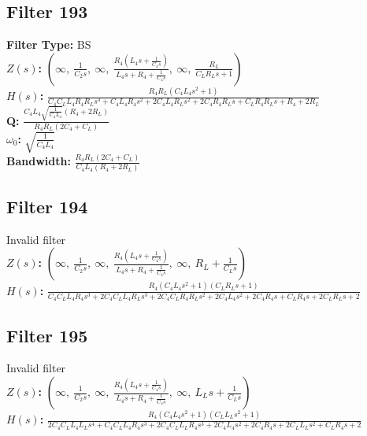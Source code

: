 \documentclass{article}
\begin{document}
\subsection*{Filter 193}
\textbf{Filter Type:} BS \\ 
\textbf{$Z(s)$:} $\left( \infty, \  \frac{1}{C_{2} s}, \  \infty, \  \frac{R_{4} \left(L_{4} s + \frac{1}{C_{4} s}\right)}{L_{4} s + R_{4} + \frac{1}{C_{4} s}}, \  \infty, \  \frac{R_{L}}{C_{L} R_{L} s + 1}\right)$ \\ 
\textbf{$H(s)$:} $\frac{R_{4} R_{L} \left(C_{4} L_{4} s^{2} + 1\right)}{C_{4} C_{L} L_{4} R_{4} R_{L} s^{3} + C_{4} L_{4} R_{4} s^{2} + 2 C_{4} L_{4} R_{L} s^{2} + 2 C_{4} R_{4} R_{L} s + C_{L} R_{4} R_{L} s + R_{4} + 2 R_{L}}$ \\ 
\textbf{Q:} $\frac{C_{4} L_{4} \sqrt{\frac{1}{C_{4} L_{4}}} \left(R_{4} + 2 R_{L}\right)}{R_{4} R_{L} \left(2 C_{4} + C_{L}\right)}$ \\ 
\textbf{$\omega_0$:} $\sqrt{\frac{1}{C_{4} L_{4}}}$ \\ 
\textbf{Bandwidth:} $\frac{R_{4} R_{L} \left(2 C_{4} + C_{L}\right)}{C_{4} L_{4} \left(R_{4} + 2 R_{L}\right)}$ \\ 
\subsection*{Filter 194}
Invalid filter \\ 
\textbf{$Z(s)$:} $\left( \infty, \  \frac{1}{C_{2} s}, \  \infty, \  \frac{R_{4} \left(L_{4} s + \frac{1}{C_{4} s}\right)}{L_{4} s + R_{4} + \frac{1}{C_{4} s}}, \  \infty, \  R_{L} + \frac{1}{C_{L} s}\right)$ \\ 
\textbf{$H(s)$:} $\frac{R_{4} \left(C_{4} L_{4} s^{2} + 1\right) \left(C_{L} R_{L} s + 1\right)}{C_{4} C_{L} L_{4} R_{4} s^{3} + 2 C_{4} C_{L} L_{4} R_{L} s^{3} + 2 C_{4} C_{L} R_{4} R_{L} s^{2} + 2 C_{4} L_{4} s^{2} + 2 C_{4} R_{4} s + C_{L} R_{4} s + 2 C_{L} R_{L} s + 2}$ \\ 
\subsection*{Filter 195}
Invalid filter \\ 
\textbf{$Z(s)$:} $\left( \infty, \  \frac{1}{C_{2} s}, \  \infty, \  \frac{R_{4} \left(L_{4} s + \frac{1}{C_{4} s}\right)}{L_{4} s + R_{4} + \frac{1}{C_{4} s}}, \  \infty, \  L_{L} s + \frac{1}{C_{L} s}\right)$ \\ 
\textbf{$H(s)$:} $\frac{R_{4} \left(C_{4} L_{4} s^{2} + 1\right) \left(C_{L} L_{L} s^{2} + 1\right)}{2 C_{4} C_{L} L_{4} L_{L} s^{4} + C_{4} C_{L} L_{4} R_{4} s^{3} + 2 C_{4} C_{L} L_{L} R_{4} s^{3} + 2 C_{4} L_{4} s^{2} + 2 C_{4} R_{4} s + 2 C_{L} L_{L} s^{2} + C_{L} R_{4} s + 2}$ \\ 
\end{document}
